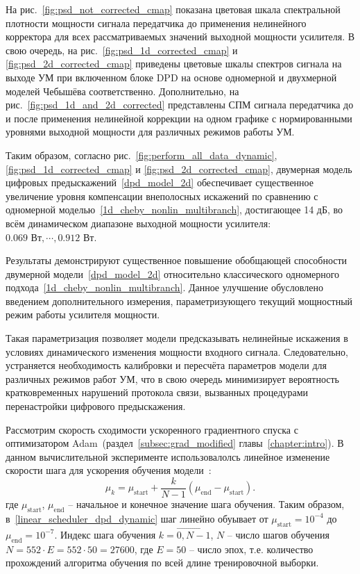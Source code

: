 На рис.~\ref{fig:psd_not_corrected_cmap} показана цветовая шкала спектральной плотности мощности сигнала передатчика до применения нелинейного корректора для всех рассматриваемых значений выходной мощности усилителя. В свою очередь, на рис.~\ref{fig:psd_1d_corrected_cmap} и \ref{fig:psd_2d_corrected_cmap} приведены цветовые шкалы спектров сигнала на выходе УМ при включенном блоке DPD на основе одномерной и двухмерной моделей Чебышёва соответственно. Дополнительно, на рис.~\ref{fig:psd_1d_and_2d_corrected} представлены СПМ сигнала передатчика до и после применения нелинейной коррекции на одном графике с нормированными уровнями выходной мощности для различных режимов работы УМ.

Таким образом, согласно рис.~\ref{fig:perform_all_data_dynamic}, \ref{fig:psd_1d_corrected_cmap} и \ref{fig:psd_2d_corrected_cmap}, двумерная модель цифровых предыскажений~\eqref{dpd_model_2d} обеспечивает существенное увеличение уровня компенсации внеполосных искажений по сравнению с одномерной моделью~\eqref{1d_cheby_nonlin_multibranch}, достигающее 14 дБ, во всём динамическом диапазоне выходной мощности усилителя: $0.069 \text{ Вт}, \cdots, 0.912 \text{ Вт}$.

Результаты демонстрируют существенное повышение обобщающей способности двумерной модели~\eqref{dpd_model_2d} относительно классического одномерного подхода~\eqref{1d_cheby_nonlin_multibranch}. Данное улучшение обусловлено введением дополнительного измерения, параметризующего текущий мощностный режим работы усилителя мощности.

Такая параметризация позволяет модели предсказывать нелинейные искажения в условиях динамического изменения мощности входного сигнала. Следовательно, устраняется необходимость калибровки и пересчёта параметров модели для различных режимов работ УМ, что в свою очередь минимизирует вероятность кратковременных нарушений протокола связи, вызванных процедурами перенастройки цифрового предыскажения.

Рассмотрим скорость сходимости ускоренного градиентного спуска с оптимизатором Adam~(раздел~\ref{subsec:grad_modified} главы~\ref{chapter:intro}). В данном вычислительной эксперименте использовалолсь линейное изменение скорости шага для ускорения обучения модели~\cite{he2016deep}:
\begin{equation}
	\mu_k=\mu_{\text{start}}+\frac{k}{N-1}(\mu_{\text{end}}-\mu_{\text{start}}).
	\label{linear_scheduler_dpd_dynamic}
\end{equation}
где $\mu_{\text{start}}$, $\mu_{\text{end}}$ -- начальное и конечное значение шага обучения. Таким образом, в~\eqref{linear_scheduler_dpd_dynamic} шаг линейно обуывает от $\mu_{\text{start}}=10^{-4}$ до $\mu_{\text{end}}=10^{-7}$. Индекс шага обучения $k=\overrightarrow{0, N-1}$, $N$ -- число шагов обучения $N=552\cdot E=552\cdot 50=27600$, где $E=50$ -- число эпох, т.е. количество прохождений алгоритма обучения по всей длине тренировочной выборки.

